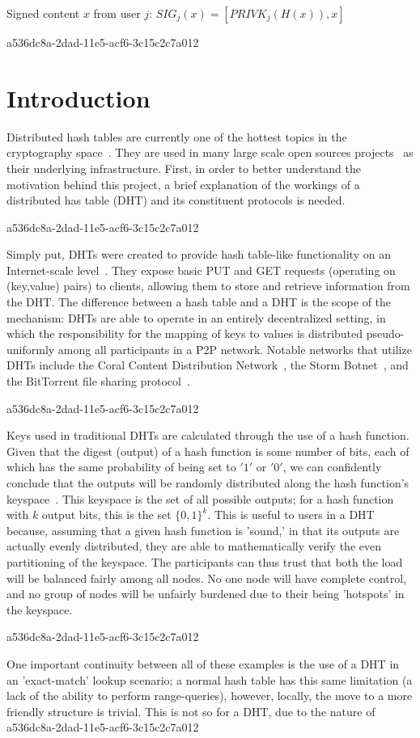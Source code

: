 \documentclass[12pt]{article}
\begin{document}
Signed content $x$ from user $j$: $SIG_j(x) = \left[ PRIVK_j( H(x) ), x \right]$

a536dc8a-2dad-11e5-acf6-3c15c2c7a012\section{Introduction}
\par Distributed hash tables are currently one of the hottest topics in the cryptography space~\cite{Stoica:2001dj,Rowstron:2001ea,Ratnasamy:2001wn}. They are used in many large scale open sources projects~\cite{Freitas:2013tb,Xu:2010vs,Perfitt:2010fh} as their underlying infrastructure. First, in order to better understand the motivation behind this project, a brief explanation of the workings of a distributed has table (DHT) and its constituent protocols is needed.

a536dc8a-2dad-11e5-acf6-3c15c2c7a012\par Simply put, DHTs were created to provide hash table-like functionality on an Internet-scale level~\cite{Ratnasamy:2001wn}. They expose basic PUT and GET requests (operating on (key,value) pairs) to clients, allowing them to store and retrieve information from the DHT. The difference between a hash table and a DHT is the scope of the mechanism: DHTs are able to operate in an entirely decentralized setting, in which the responsibility for the mapping of keys to values is distributed pseudo-uniformly among all participants in a P2P network. Notable networks that utilize DHTs include the Coral Content Distribution Network~\cite{Freedman:2004vb}, the Storm Botnet~\cite{Holz:2008uk}, and the BitTorrent file sharing protocol~\cite{Cohen:y1_8mBnw}.

a536dc8a-2dad-11e5-acf6-3c15c2c7a012\par Keys used in traditional DHTs are calculated through the use of a hash function. Given that the digest (output) of a hash function is some number of bits, each of which has the same probability of being set to $'1'$ or $'0'$, we can confidently conclude that the outputs will be randomly distributed along the hash function's keyspace~. This keyspace is the set of all possible outputs; for a hash function with $k$ output bits, this is the set $\{0,1\}^k$. This is useful to users in a DHT because, assuming that a given hash function is 'sound,' in that its outputs are actually evenly distributed, they are able to mathematically verify the even partitioning of the keyspace. The participants can thus trust that both the load will be balanced fairly among all nodes. No one node will have complete control, and no group of nodes will be unfairly burdened due to their being 'hotspots' in the keyspace.~

a536dc8a-2dad-11e5-acf6-3c15c2c7a012\par One important continuity between all of these examples is the use of a DHT in an 'exact-match' lookup scenario; a normal hash table has this same limitation (a lack of the ability to perform range-queries), however, locally, the move to a more friendly structure is trivial. This is not so for a DHT, due to the nature of
a536dc8a-2dad-11e5-acf6-3c15c2c7a012\printbibliography
\end{document}

